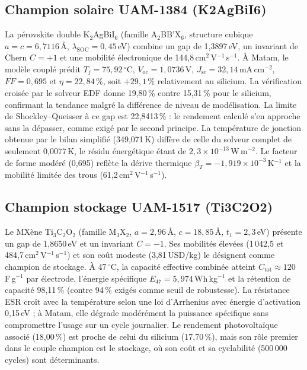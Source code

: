 \documentclass[11pt,a4paper,french]{article}
\begin{document}
\subsection{Champion solaire UAM-1384 (K2AgBiI6)}

La pérovskite double K$_2$AgBiI$_6$ (famille A$_2$BB'X$_6$, structure cubique $a=c=6{,}7116$\,Å, $\lambda_{\mathrm{SOC}}=0{,}45$\,eV) combine un gap de 1{,}3897\,eV, un invariant de Chern $C=+1$ et une mobilité électronique de 144,8\,cm$^2$\,V$^{-1}$\,s$^{-1}$. À Matam, le modèle couplé prédit $T_j=75{,}92\,^\circ$C, $V_{\mathrm{oc}}=1{,}0736$\,V, $J_{\mathrm{sc}}=32{,}14$\,mA\,cm$^{-2}$, $FF=0{,}695$ et $\eta=22{,}84\,\%$, soit $+29{,}1\,\%$ relativement au silicium. La vérification croisée par le solveur EDF donne 19,80\,\% contre 15,31\,\% pour le silicium, confirmant la tendance malgré la différence de niveau de modélisation. La limite de Shockley--Queisser à ce gap est 22,8413\,\% : le rendement calculé s'en approche sans la dépasser, comme exigé par le second principe. La température de jonction obtenue par le bilan simplifié (349,071\,K) diffère de celle du solveur complet de seulement 0,0077\,K, le résidu énergétique étant de $2{,}3\times10^{-13}$\,W\,m$^{-2}$. Le facteur de forme modéré (0,695) reflète la dérive thermique $\beta_T=-1{,}919\times10^{-3}$\,K$^{-1}$ et la mobilité limitée des trous (61,2\,cm$^2$\,V$^{-1}$\,s$^{-1}$).

\subsection{Champion stockage UAM-1517 (Ti3C2O2)}

Le MXène Ti$_3$C$_2$O$_2$ (famille M$_3$X$_2$, $a=2{,}96$\,Å, $c=18{,}85$\,Å, $t_1=2{,}3$\,eV) présente un gap de 1{,}8650\,eV et un invariant $C=-1$. Ses mobilités élevées (1\,042,5 et 484,7\,cm$^2$\,V$^{-1}$\,s$^{-1}$) et son coût modeste (3,81\,USD/kg) le désignent comme champion de stockage. À 47\,$^\circ$C, la capacité effective combinée atteint $C_{\mathrm{tot}}\approx120$\,F\,g$^{-1}$ par électrode, l'énergie spécifique $E_{47}=5{,}974$\,Wh\,kg$^{-1}$ et la rétention de capacité 98,11\,\% (contre 94\,\% exigés comme seuil de robustesse). La résistance ESR croît avec la température selon une loi d'Arrhenius avec énergie d'activation 0,15\,eV ; à Matam, elle dégrade modérément la puissance spécifique sans compromettre l'usage sur un cycle journalier. Le rendement photovoltaïque associé (18,00\,\%) est proche de celui du silicium (17,70\,\%), mais son rôle premier dans le couple champion est le stockage, où son coût et sa cyclabilité (500\,000 cycles) sont déterminants.
\end{document}
